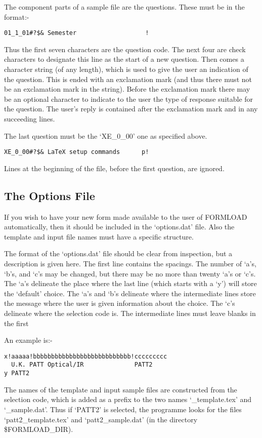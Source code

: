 The component parts of a sample file are the questions. These must be in
the format:-

\begin{verbatim}
01_1_01#?$& Semester                   !
\end{verbatim}

Thus the first seven characters are the question code. The next four are
check characters to designate this line as the start of a new question.
Then comes a character string (of any length), which is used to give the
user an indication of the question. This is ended with an exclamation mark
(and thus there must not be an exclamation mark in the string). Before the
exclamation mark there may be an optional character to indicate to the user
the type of response suitable for the question. The user's reply is
contained after the exclamation mark and in any succeeding lines.

The last question must be the `XE\_0\_00' one as specified above.

\begin{verbatim}
XE_0_00#?$& LaTeX setup commands      p!
\end{verbatim}

Lines at the beginning of the file, before the first question, are ignored.


\subsection{The Options File}

If you wish to have your new form made available to the user of FORMLOAD
automatically, then it should be included in the `options.dat' file. Also
the template and input file names must have a specific structure.

The format of the `options.dat' file should be clear from inspection, but a
description is given here. The first line contains the spacings. The number
of `a's, `b's, and `c's may be changed, but there may be no more than
twenty `a's or `c's. The `a's delineate the place where the last line
(which starts with a `y') will store the `default' choice. The `a's and
`b's delineate where the intermediate lines store the message where the
user is given information about the choice. The `c's delineate where the
selection code is. The intermediate lines must leave blanks in the first

An example is:-

\begin{verbatim}
x!aaaaa!bbbbbbbbbbbbbbbbbbbbbbbbbbb!ccccccccc
  U.K. PATT Optical/IR              PATT2
y PATT2
\end{verbatim}

The names of the template and input sample files are constructed from the
selection code, which is added as a prefix to the two names
`\_template.tex' and `\_sample.dat'. Thus if `PATT2' is selected, the
programme looks for the files `patt2\_template.tex' and `patt2\_sample.dat'
(in the directory \$FORMLOAD\_DIR).


